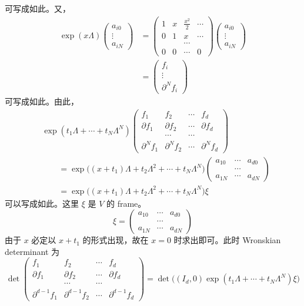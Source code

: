 可写成如此。又，
\[
\begin{aligned}
\exp(x\Lambda)
\begin{pmatrix}
a_{i0}\\ \vdots\\ a_{iN}
\end{pmatrix}
&=
\begin{pmatrix}
1 & x & \frac{x^2}{2} & \cdots\\
0 & 1 & x & \cdots\\
 & & \cdots & \\
0 & 0 & \cdots & 0
\end{pmatrix}
\begin{pmatrix}
a_{i0}\\ \vdots\\ a_{iN}
\end{pmatrix}\\
&=
\begin{pmatrix}
f_i\\ \vdots\\ \partial^N f_i
\end{pmatrix}
\end{aligned}
\]
可写成如此。由此，
\[
\begin{aligned}
&\exp(t_1\Lambda+\cdots+t_N\Lambda^N)
\begin{pmatrix}
f_1 & f_2 & \cdots & f_d\\
\partial f_1 & \partial f_2 & \cdots & \partial f_d\\
 & \cdots & \cdots & \\
\partial^N f_1 & \partial^N f_2 & \cdots & \partial^N f_d
\end{pmatrix}\\
&\qquad=\exp\bigl((x+t_1)\Lambda+t_2\Lambda^2+\cdots+t_N\Lambda^N\bigr)
\begin{pmatrix}
a_{10} & \cdots & a_{d0}\\
 & \cdots & \\
a_{1N} & \cdots & a_{dN}
\end{pmatrix}\\
&\qquad=\exp\bigl((x+t_1)\Lambda+t_2\Lambda^2+\cdots+t_N\Lambda^N\bigr)\xi
\end{aligned}
\]
可以写成如此。这里 $\xi$ 是 $V$ 的 frame。
\[
\xi=
\begin{pmatrix}
a_{10} & \cdots & a_{d0}\\
 & \cdots & \\
a_{1N} & \cdots & a_{dN}
\end{pmatrix}
\]
由于 $x$ 必定以 $x+t_1$ 的形式出现，故在 $x=0$ 时求出即可。此时 Wronskian determinant 为
\[
\det
\begin{pmatrix}
f_1 & f_2 & \cdots & f_d\\
\partial f_1 & \partial f_2 & \cdots & \partial f_d\\
 & \cdots & \cdots & \\
\partial^{d-1}f_1 & \partial^{d-1}f_2 & \cdots & \partial^{d-1}f_d
\end{pmatrix}
=\det\bigl((I_d,0)\exp(t_1\Lambda+\cdots+t_N\Lambda^N)\xi\bigr)
\]

